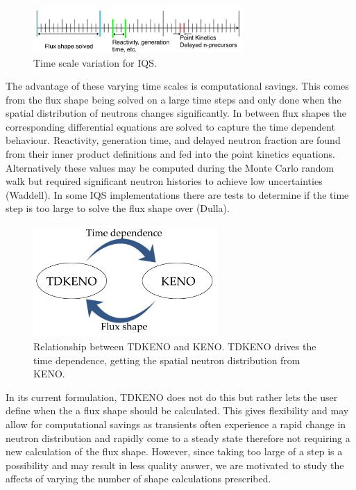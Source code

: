\documentclass{anstrans}
\begin{document}
\begin{figure}[h]
    \centering
    \includegraphics[width=8cm]{figures/time_scale.pdf}
    \caption{Time scale variation for IQS.}
    \label{fig:time_scale}
\end{figure}

The advantage of these varying time scales is computational savings.  This comes from the flux shape being solved on a large time steps and only done when the spatial distribution of neutrons changes significantly.  In between flux shapes the corresponding differential equations are solved to capture the time dependent behaviour.  Reactivity, generation time, and delayed neutron fraction are found from their inner product definitions and fed into the point kinetics equations.  Alternatively these values may be computed during the Monte Carlo random walk but required significant neutron histories to achieve low uncertainties (Waddell). In some IQS implementations there are tests to determine if the time step is too large to solve the flux shape over (Dulla). 

\begin{figure}[h]
    \centering
    \includegraphics[width=7cm]{figures/tdkeno_flow.pdf}
    \caption{Relationship between TDKENO and KENO.  TDKENO drives the time dependence, getting the spatial neutron distribution from KENO.}
    \label{fig:tdkeno_flow}
\end{figure}

 In its current formulation, TDKENO does not do this but rather lets the user define when the a flux shape should be calculated.  This gives flexibility and may allow for computational savings as transients often experience a rapid change in neutron distribution and rapidly come to a steady state therefore not requiring a new calculation of the flux shape. However, since taking too large of a step is a possibility and may result in less quality answer, we are motivated to study the affects of varying the number of shape calculations prescribed.
\end{document}
